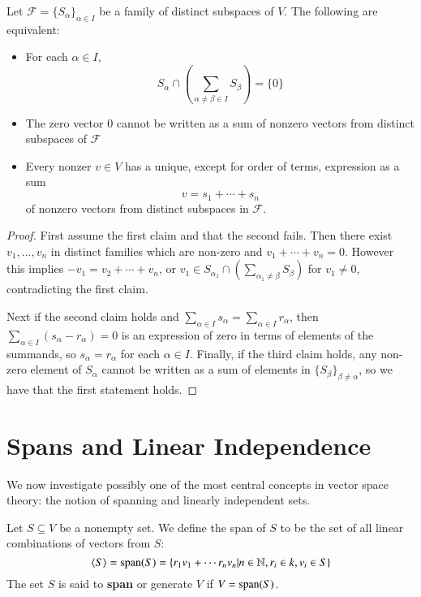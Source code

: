 \begin{theorem}
    Let $\mathcal{F} = \{S_{\alpha}\}_{\alpha \in I}$ be a family of distinct subspaces of $V$. The following are equivalent: \begin{itemize}
        \item For each $\alpha \in I$, \begin{equation*}
                S_{\alpha}\cap\left(\sum_{\alpha\neq \beta \in I}S_{\beta}\right) = \{0\}
        \end{equation*}
        \item The zero vector $0$ cannot be written as a sum of nonzero vectors from distinct subspaces of $\mathcal{F}$
        \item Every nonzer $v \in V$ has a unique, except for order of terms, expression as a sum $$v = s_1+\cdots + s_n$$
            of nonzero vectors from distinct subspaces in $\mathcal{F}$.
    \end{itemize}
\end{theorem}
\begin{proof}
    First assume the first claim and that the second fails. Then there exist $v_1,...,v_n$ in distinct families which are non-zero and $v_1+\cdots +v_n = 0$. However this implies $-v_1 = v_2+\cdots + v_n$, or $v_1 \in S_{\alpha_1}\cap\left(\sum_{\alpha_1\neq \beta}S_{\beta}\right)$ for $v_1 \neq 0$, contradicting the first claim. 

    Next if the second claim holds and $\sum_{\alpha \in I}s_{\alpha} = \sum_{\alpha \in I}r_{\alpha}$, then $\sum_{\alpha \in I}(s_{\alpha}-r_{\alpha}) = 0$ is an expression of zero in terms of elements of the summands, so $s_{\alpha} = r_{\alpha}$ for each $\alpha \in I$. Finally, if the third claim holds, any non-zero element of $S_{\alpha}$ cannot be written as a sum of elements in $\{S_{\beta}\}_{\beta \neq \alpha}$, so we have that the first statement holds.
\end{proof}


\section{Spans and Linear Independence}\label{sec:SpanLinInd}

We now investigate possibly one of the most central concepts in vector space theory: the notion of spanning and linearly independent sets.

\begin{definition}
    Let $S \subseteq V$ be a nonempty set. We define the span of $S$ to be the set of all linear combinations of vectors from $S$: \begin{equation*}
        \langle S\rangle = \operatorname{span}(S) = \{r_1v_1+\cdots r_nv_n| n\in \mathbb N, r_i \in k,v_i \in S\}
    \end{equation*}
    The set $S$ is said to \textbf{span} or generate $V$ if $V = \operatorname{span}(S)$. 
\end{definition}

